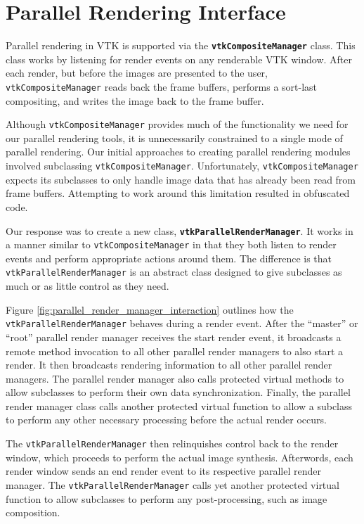 \documentclass{acmsiggraph}
\newcommand{\cidentifier}[1]{\texttt{#1}}
\newcommand{\keyterm}[1]{\textbf{#1}}
\begin{document}
  \section{Parallel Rendering Interface}
  \label{sec:parallel_rendering_interface}

  Parallel rendering in VTK is supported via the
  \keyterm{\cidentifier{vtk\-Composite\-Manager}} class.  This class works
  by listening for render events on any renderable VTK window.  After each
  render, but before the images are presented to the user,
  \cidentifier{vtk\-Composite\-Manager} reads back the frame buffers,
  performs a sort-last compositing, and writes the image back to the frame
  buffer.

  Although \cidentifier{vtk\-Composite\-Manager} provides much of the
  functionality we need for our parallel rendering tools, it is
  unnecessarily constrained to a single mode of parallel rendering.  Our
  initial approaches to creating parallel rendering modules involved
  subclassing \cidentifier{vtk\-Composite\-Manager}.  Unfortunately,
  \cidentifier{vtk\-Composite\-Manager} expects its subclasses to only
  handle image data that has already been read from frame buffers.
  Attempting to work around this limitation resulted in obfuscated code.

  Our response was to create a new class,
  \keyterm{\cidentifier{vtk\-Parallel\-Render\-Manager}}.  It works in a
  manner similar to \cidentifier{vtk\-Composite\-Manager} in that they both
  listen to render events and perform appropriate actions around them.  The
  difference is that \cidentifier{vtk\-Parallel\-Render\-Manager} is an
  abstract class designed to give subclasses as much or as little control
  as they need.

  Figure \ref{fig:parallel_render_manager_interaction} outlines how the
  \cidentifier{vtk\-Parallel\-Render\-Manager} behaves during a render
  event.  After the ``master'' or ``root'' parallel render manager receives
  the start render event, it broadcasts a remote method invocation to all
  other parallel render managers to also start a render.  It then
  broadcasts rendering information to all other parallel render managers.
  The parallel render manager also calls protected virtual methods to allow
  subclasses to perform their own data synchronization.  Finally, the
  parallel render manager class calls another protected virtual function to
  allow a subclass to perform any other necessary processing before the
  actual render occurs.

  The \cidentifier{vtk\-Parallel\-Render\-Manager} then relinquishes
  control back to the render window, which proceeds to perform the actual
  image synthesis.  Afterwords, each render window sends an end render
  event to its respective parallel render manager.  The
  \cidentifier{vtk\-Parallel\-Render\-Manager} calls yet another protected
  virtual function to allow subclasses to perform any post-processing, such
  as image composition.
\end{document}

